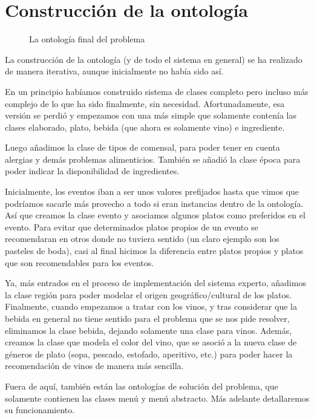 % 

\section{Construcción de la ontología}

\begin{figure}[h!]
  \caption{La ontología final del problema}
\end{figure}

La construcción de la ontología (y de todo el sistema en general) se ha
realizado de manera iterativa, aunque inicialmente no había sido así.

En un principio habíamos construido sistema de clases completo pero incluso más
complejo de lo que ha sido finalmente, sin necesidad. Afortunadamente, esa
versión se perdió y empezamos con una más simple que solamente contenía las
clases elaborado, plato, bebida (que ahora es solamente vino) e ingrediente.

Luego añadimos la clase de tipos de comensal, para poder tener en cuenta
alergias y demás problemas alimenticios. También se añadió la clase época para
poder indicar la disponibilidad de ingredientes.

Inicialmente, los eventos iban a ser unos valores prefijados hasta que vimos
que podríamos sacarle más provecho a todo si eran instancias dentro de la
ontología. Así que creamos la clase evento y asociamos algunos platos como
preferidos en el evento. Para evitar que determinados platos propios de un
evento se recomendaran en otros donde no tuviera sentido (un claro ejemplo son
los pasteles de boda), casi al final hicimos la diferencia entre platos propios
y platos que son recomendables para los eventos.

Ya, más entrados en el proceso de implementación del sistema experto, añadimos
la clase región para poder modelar el origen geográfico/cultural de los
platos. Finalmente, cuando empezamos a tratar con los vinos, y tras considerar
que la bebida en general no tiene sentido para el problema que se nos pide
resolver, eliminamos la clase bebida, dejando solamente una clase para
vinos. Además, creamos la clase que modela el color del vino, que se asoció a
la nueva clase de géneros de plato (sopa, pescado, estofado, aperitivo, etc.)
para poder hacer la recomendación de vinos de manera más sencilla.

Fuera de aquí, también están las ontologías de solución del problema, que
solamente contienen las clases menú y menú abstracto. Más adelante detallaremos
su funcionamiento.


